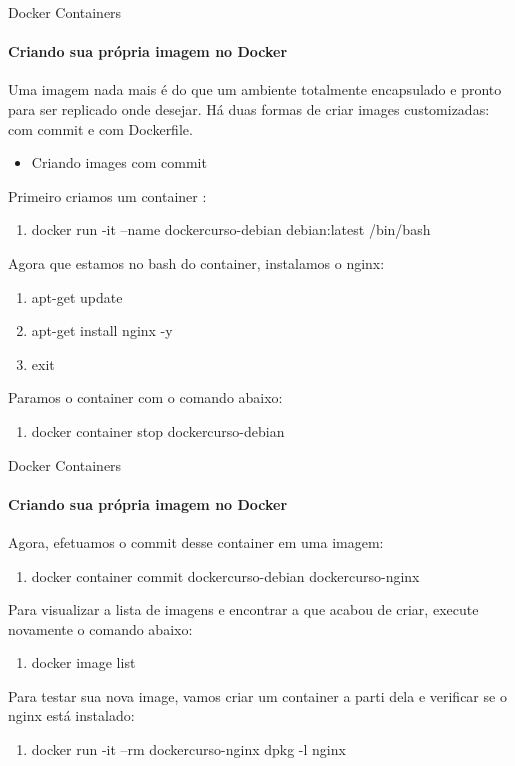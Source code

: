 \documentclass{beamer}
\begin{document}
\begin{frame}{Docker Containers}
    \framesubtitle{Criando sua pr\'opria imagem no Docker}
    Uma imagem nada mais \'e do que um ambiente totalmente encapsulado e pronto para ser replicado onde desejar.
    Há duas formas de criar images customizadas: com commit e com Dockerfile.
    \begin{itemize}
        \item Criando images com commit
    \end{itemize}
    Primeiro criamos um container :
    \begin{enumerate}
        \item docker run -it --name dockercurso-debian debian:latest /bin/bash
    \end{enumerate} 
    Agora que estamos no bash do container, instalamos o nginx:
    \begin{enumerate}
        \item apt-get update
        \item apt-get install nginx -y
        \item exit
    \end{enumerate}
    Paramos o container com o comando abaixo:
    \begin{enumerate}
        \item docker container stop dockercurso-debian 
    \end{enumerate}
\end{frame}

\begin{frame}{Docker Containers}
    \framesubtitle{Criando sua pr\'opria imagem no Docker}
    Agora, efetuamos o commit desse container em uma imagem:
    \begin{enumerate}
        \item docker container commit dockercurso-debian dockercurso-nginx
    \end{enumerate}
    Para visualizar a lista de imagens e encontrar a que acabou de criar,
    execute novamente o comando abaixo:
    \begin{enumerate}
        \item docker image list
    \end{enumerate}
    Para testar sua nova image, vamos criar um container a parti dela e verificar se o nginx está instalado:
    \begin{enumerate}
        \item docker run -it --rm dockercurso-nginx dpkg -l nginx
    \end{enumerate}
\end{frame}
\end{document}
